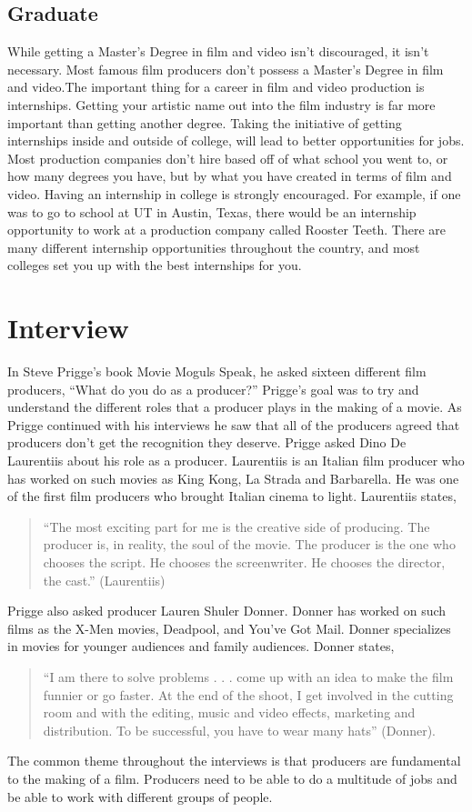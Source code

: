 \begin{multicols}{2}
    \subsection{Graduate}
		While getting a Master’s Degree in film and video isn’t discouraged, it isn’t necessary. Most famous film producers don’t possess a Master's Degree in film and video.The important thing for a career in film and video production is internships. Getting your artistic name out into the film industry is far more important than getting another degree. Taking the initiative of getting internships inside and outside of college, will lead to better opportunities for jobs. Most production companies don’t hire based off of what school you went to, or how many degrees you have, but by what you have created in terms of film and video. Having an internship in college is strongly encouraged. For example, if one was to go to school at UT in Austin, Texas, there would be an internship opportunity to work at a production company called Rooster Teeth. There are many different internship opportunities throughout the country, and most colleges set you up with the best internships for you. 

\section{Interview}
	In Steve Prigge’s book Movie Moguls Speak, he asked sixteen different film producers, “What do you do as a producer?” Prigge’s goal was to try and understand the different roles that a producer plays in the making of a movie. As Prigge continued with his interviews he saw that all of the producers agreed that producers don’t get the recognition they deserve. 
	Prigge asked Dino De Laurentiis about his role as a producer. Laurentiis is an Italian film producer who has worked on such movies as King Kong, La Strada and Barbarella. He was one of the first film producers who brought Italian cinema to light. Laurentiis states, 
\begin{quote}
	“The most exciting part for me is the creative side of producing. The producer is, in reality, the soul of the movie. The producer is the one who chooses the script. He chooses the screenwriter. He chooses the director, the cast.” (Laurentiis) 
\end{quote}
	Prigge also asked producer Lauren Shuler Donner. Donner has worked on such films as the X-Men movies, Deadpool, and You’ve Got Mail. Donner specializes in movies for younger audiences and family audiences. Donner states,
\begin{quote}
	“I am there to solve problems . . . come up with an idea to make the film funnier or go faster. At the end of the shoot, I get involved in the cutting room and with the editing, music and video effects, marketing and distribution. To be successful, you have to wear many hats” (Donner).
\end{quote}
	The common theme throughout the interviews is that producers are fundamental to the making of a film. Producers need to be able to do a multitude of jobs and be able to work with different groups of people.


\end{multicols}
